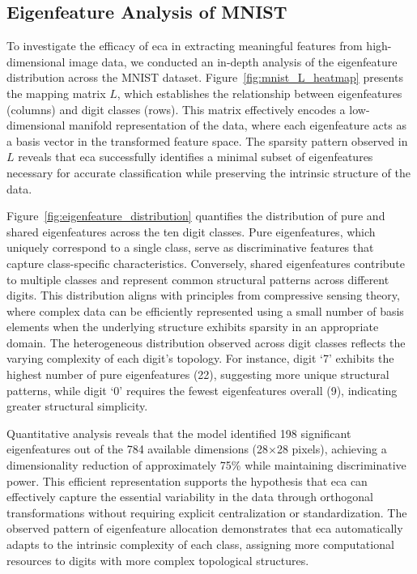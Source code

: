 \documentclass[lettersize,journal]{IEEEtran}
\begin{document}
\subsection{Eigenfeature Analysis of MNIST}

To investigate the efficacy of \Gls{eca} in extracting meaningful features from high-dimensional image data, we conducted an in-depth analysis of the eigenfeature distribution across the MNIST dataset. Figure~\ref{fig:mnist_L_heatmap} presents the mapping matrix $L$, which establishes the relationship between eigenfeatures (columns) and digit classes (rows). This matrix effectively encodes a low-dimensional manifold representation of the data, where each eigenfeature acts as a basis vector in the transformed feature space. The sparsity pattern observed in $L$ reveals that \Gls{eca} successfully identifies a minimal subset of eigenfeatures necessary for accurate classification while preserving the intrinsic structure of the data.

Figure~\ref{fig:eigenfeature_distribution} quantifies the distribution of pure and shared eigenfeatures across the ten digit classes. Pure eigenfeatures, which uniquely correspond to a single class, serve as discriminative features that capture class-specific characteristics. Conversely, shared eigenfeatures contribute to multiple classes and represent common structural patterns across different digits. This distribution aligns with principles from compressive sensing theory, where complex data can be efficiently represented using a small number of basis elements when the underlying structure exhibits sparsity in an appropriate domain. The heterogeneous distribution observed across digit classes reflects the varying complexity of each digit's topology. For instance, digit `7' exhibits the highest number of pure eigenfeatures (22), suggesting more unique structural patterns, while digit `0' requires the fewest eigenfeatures overall (9), indicating greater structural simplicity.

Quantitative analysis reveals that the model identified 198 significant eigenfeatures out of the 784 available dimensions (28×28 pixels), achieving a dimensionality reduction of approximately 75\% while maintaining discriminative power. This efficient representation supports the hypothesis that \Gls{eca} can effectively capture the essential variability in the data through orthogonal transformations without requiring explicit centralization or standardization. The observed pattern of eigenfeature allocation demonstrates that \Gls{eca} automatically adapts to the intrinsic complexity of each class, assigning more computational resources to digits with more complex topological structures.
\end{document}
